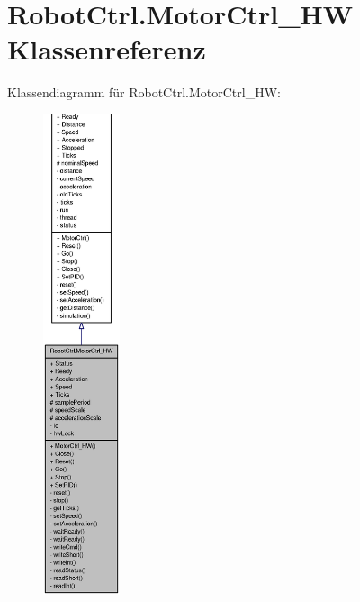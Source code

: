 \hypertarget{class_robot_ctrl_1_1_motor_ctrl___h_w}{
\section{RobotCtrl.MotorCtrl\_\-HW Klassenreferenz}
\label{class_robot_ctrl_1_1_motor_ctrl___h_w}
}


Klassendiagramm für RobotCtrl.MotorCtrl\_\-HW:\nopagebreak
\begin{figure}[H]
\begin{center}
\leavevmode
\includegraphics[height=400pt]{class_robot_ctrl_1_1_motor_ctrl___h_w__inherit__graph}
\end{center}
\end{figure}


